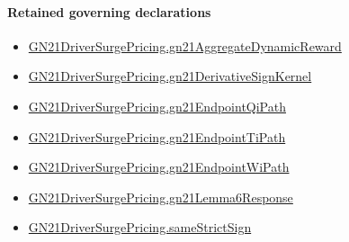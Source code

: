 \documentclass[10pt]{article}
\begin{document}
\paragraph{Retained governing declarations}
\begin{itemize}\raggedright
\item \hyperlink{governing-declaration-014b12f4f75ccdb4}{GN21\allowbreak{}Driver\allowbreak{}Surge\allowbreak{}Pricing.\allowbreak{}gn21\allowbreak{}Aggregate\allowbreak{}Dynamic\allowbreak{}Reward}
\item \hyperlink{governing-declaration-d60579a03ce3baca}{GN21\allowbreak{}Driver\allowbreak{}Surge\allowbreak{}Pricing.\allowbreak{}gn21\allowbreak{}Derivative\allowbreak{}Sign\allowbreak{}Kernel}
\item \hyperlink{governing-declaration-22bcf97296622d31}{GN21\allowbreak{}Driver\allowbreak{}Surge\allowbreak{}Pricing.\allowbreak{}gn21\allowbreak{}Endpoint\allowbreak{}Qi\allowbreak{}Path}
\item \hyperlink{governing-declaration-55d93f96ff329745}{GN21\allowbreak{}Driver\allowbreak{}Surge\allowbreak{}Pricing.\allowbreak{}gn21\allowbreak{}Endpoint\allowbreak{}Ti\allowbreak{}Path}
\item \hyperlink{governing-declaration-dceaddfe91d03dd1}{GN21\allowbreak{}Driver\allowbreak{}Surge\allowbreak{}Pricing.\allowbreak{}gn21\allowbreak{}Endpoint\allowbreak{}Wi\allowbreak{}Path}
\item \hyperlink{governing-declaration-068ec7eedec65036}{GN21\allowbreak{}Driver\allowbreak{}Surge\allowbreak{}Pricing.\allowbreak{}gn21\allowbreak{}Lemma6\allowbreak{}Response}
\item \hyperlink{governing-declaration-867d0251c5f9e2dc}{GN21\allowbreak{}Driver\allowbreak{}Surge\allowbreak{}Pricing.\allowbreak{}same\allowbreak{}Strict\allowbreak{}Sign}
\end{itemize}
\end{document}
